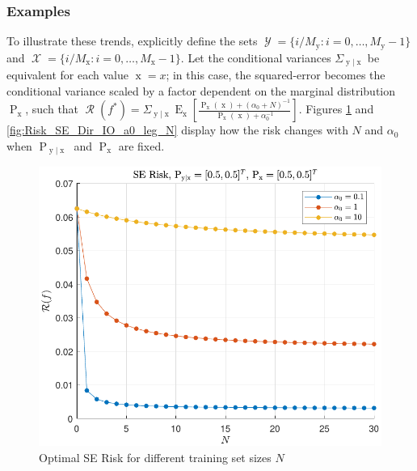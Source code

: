 \documentclass{article}
\DeclareMathOperator{\xrm}{\mathrm{x}}
\DeclareMathOperator{\yrm}{\mathrm{y}}
\DeclareMathOperator{\Prm}{\mathrm{P}}
\DeclareMathOperator{\Erm}{\mathrm{E}}
\DeclareMathOperator{\Xcal}{\mathcal{X}}
\DeclareMathOperator{\Ycal}{\mathcal{Y}}
\DeclareMathOperator{\Rcal}{\mathcal{R}}
\begin{document}
\subsubsection{Examples}

To illustrate these trends, explicitly define the sets $\Ycal = \{ i/M_{\yrm} : i = 0,\ldots,M_{\yrm}-1 \}$ and $\Xcal = \{ i/M_{\xrm} : i = 0,\ldots,M_{\xrm}-1 \}$. Let the conditional variances $\Sigma_{\yrm | \xrm}$ be equivalent for each value $\xrm = x$; in this case, the squared-error becomes the conditional variance scaled by a factor dependent on the marginal distribution $\Prm_{\xrm}$, such that $\Rcal(f^*) = \Sigma_{\yrm | \xrm} \Erm_{\xrm} \left[ \frac{\Prm_{\xrm}(\xrm) + (\alpha_0+N)^{-1}}{\Prm_{\xrm}(\xrm) + \alpha_0^{-1}} \right]$.  Figures \ref{fig:Risk_SE_Dir_IO_N_leg_a0} and \ref{fig:Risk_SE_Dir_IO_a0_leg_N} display how the risk changes with $N$ and $\alpha_0$ when $\Prm_{\yrm|\xrm}$ and $\Prm_{\xrm}$ are fixed.

\begin{figure}
\centering
\includegraphics[width=1.0\linewidth]{Risk_SE_Dir_IO_N_leg_a0.pdf}
\caption{Optimal SE Risk for different training set sizes $N$}
\label{fig:Risk_SE_Dir_IO_N_leg_a0}
\end{figure}
\end{document}
